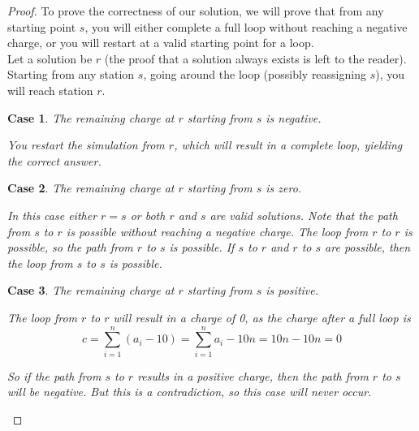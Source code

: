 \documentclass{article}
\newtheorem{case}{Case}
\begin{document}
\begin{proof} 
To prove the correctness of our solution, we will prove that from any starting point $s$, you will either complete a full loop without reaching a negative charge, or you will restart at a valid starting point for a loop. \\


Let a solution be $r$ (the proof that a solution always exists is left to the reader). Starting from any station $s$, going around the loop (possibly reassigning $s$), you will reach station $r$. 

\begin{case} The remaining charge at $r$ starting from $s$ is negative.

You restart the simulation from $r$, which will result in a complete loop, yielding the correct answer.
\end{case}


\begin{case} The remaining charge at $r$ starting from $s$ is zero.  

In this case either $r = s$ or both $r$ and $s$ are valid solutions. 
Note that the path from $s$ to $r$ is possible without reaching a negative charge. The loop from $r$ to $r$ is possible, so the path from $r$ to $s$ is possible. If $s$ to $r$ and $r$ to $s$ are possible, then the loop from $s$ to $s$ is possible.
\end{case}

\begin{case} The remaining charge at $r$ starting from $s$ is positive.

The loop from $r$ to $r$ will result in a charge of 0, as the charge after a full loop is
$$\displaystyle c = \sum_{i=1}^{n} (a_i - 10) = \sum_{i=1}^{n} a_i - 10n = 10n - 10n = 0$$

So if the path from $s$ to $r$ results in a positive charge, then the path from $r$ to $s$ will be negative. But this is a contradiction, so this case will never occur.
\end{case} 

\end{proof} 
\end{document}

